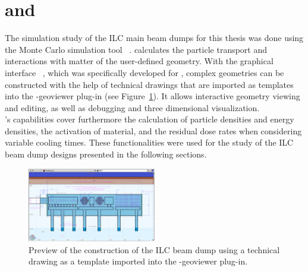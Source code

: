 \section{\fluka and \flair}
\label{BeamDumps:fluka}
The simulation study of the ILC main beam dumps for this thesis was done using the Monte Carlo simulation tool \fluka~\cite{FLUKA,FLUKA2}.
\fluka calculates the particle transport and interactions with matter of the user-defined geometry.
With the graphical interface \flair~\cite{FLAIR}, which was specifically developed for \fluka, complex geometries can be constructed with the help of technical drawings that are imported as templates into the \flair-geoviewer plug-in (see Figure~\ref{fig:BeamDumps:geoviewer}).
It allows interactive geometry viewing and editing, as well as debugging and three dimensional visualization.
\\\fluka's capabilities cover furthermore the calculation of particle densities and energy densities, the activation of material, and the residual dose rates when considering variable cooling times.
These functionalities were used for the study of the ILC beam dump designs presented in the following sections.
\begin{figure}[hbp]
\centering
\includegraphics[width=0.5\textwidth]{Figures/BeamDump/Design2_geometry_drawing_xz.png}
\caption[Preview of the geometry construction in \flair]{Preview of the construction of the ILC beam dump using a technical drawing as a template imported into the \flair-geoviewer plug-in.}
\label{fig:BeamDumps:geoviewer}
\end{figure}

